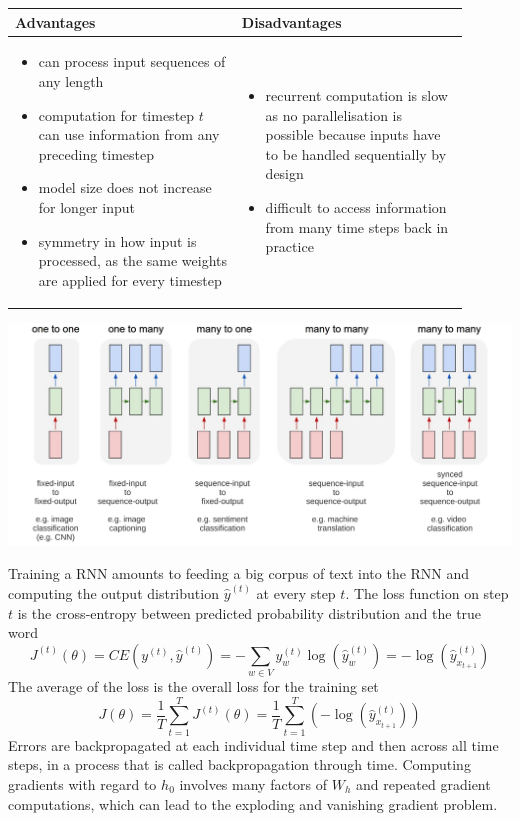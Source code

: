 \documentclass[11pt]{article}
\begin{document}
\begin{tabularx}{\linewidth}{p{0.45\linewidth} p{0.45\linewidth}}
	{\color{Green3} \textbf{Advantages}} & {\color{Firebrick3} \textbf{Disadvantages}} \\
	\hline
	\begin{itemize}[label={\color{Green3}\small+}, leftmargin=*]
		\item can process input sequences of any length
		\item computation for timestep $t$ can use information from any preceding timestep
		\item model size does not increase for longer input
		\item symmetry in how input is processed, as the same weights are applied for every timestep
	\end{itemize}
	&
	\begin{itemize}[label={\color{Firebrick3}-}, leftmargin=*]
		\item recurrent computation is slow as no parallelisation is possible because inputs have to be handled sequentially by design
		\item difficult to access information from many time steps back in practice
	\end{itemize}
\end{tabularx}
\begin{center}
	\includegraphics[width=0.8\linewidth]{img/rnn_models}
\end{center}
Training a RNN amounts to feeding a big corpus of text into the RNN and computing the output distribution $\hat{y}^{(t)}$ at every step $t$. The loss function on step $t$ is the cross-entropy between predicted probability distribution and the true word
\begin{equation*}
	J^{(t)}(\theta) = CE(y^{(t)}, \hat{y}^{(t)}) = -\sum_{w\in V} y_w^{(t)} \log\left(\hat{y}_w^{(t)}\right) = -\log\left(\hat{y}_{x_{t+1}}^{(t)}\right)
\end{equation*}
The average of the loss is the overall loss for the training set
\begin{equation*}
	J(\theta) = \frac{1}{T}\sum_{t=1}^{T}J^{(t)} (\theta) = \frac{1}{T} \sum_{t=1}^{T}\left(-\log\left(\hat{y}_{x_{t+1}}^{(t)}\right)\right)
\end{equation*}
Errors are backpropagated at each individual time step and then across all time steps, in a process that is called backpropagation through time. Computing gradients with regard to $h_0$ involves many factors of $W_h$ and repeated gradient computations, which can lead to the exploding and vanishing gradient problem.
\end{document}

